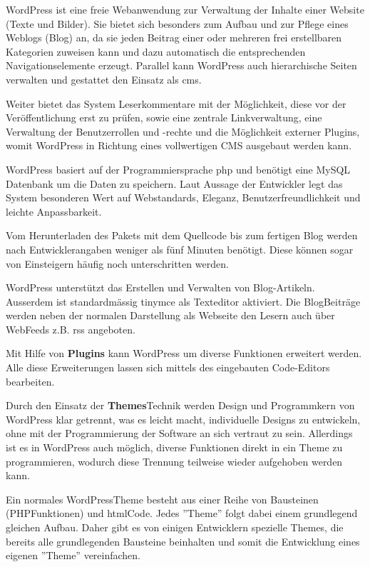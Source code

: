 \documentclass[a4paper,11pt,twoside,titlepage,openright]{report}
\numberwithin{equation}{section}		%
\numberwithin{figure}{section}			%
\numberwithin{table}{section}				%
\begin{document}
WordPress ist eine freie Webanwendung zur Verwaltung der Inhalte einer Website (Texte und Bilder). Sie bietet sich besonders zum Aufbau und zur Pflege eines Weblogs (Blog) an, da sie jeden Beitrag einer oder mehreren frei erstellbaren Kategorien zuweisen kann und dazu automatisch die entsprechenden Navigationselemente erzeugt. Parallel kann WordPress auch hierarchische Seiten verwalten und gestattet den Einsatz als \gls{cms}.

Weiter bietet das System Leserkommentare mit der Möglichkeit, diese vor der Veröffentlichung erst zu prüfen, sowie eine zentrale Linkverwaltung, eine Verwaltung der Benutzerrollen und -rechte und die Möglichkeit externer Plugins, womit WordPress in Richtung eines vollwertigen CMS ausgebaut werden kann.

WordPress basiert auf der Programmiersprache \acrshort{php} und benötigt eine MySQL Datenbank um die Daten zu speichern. Laut Aussage der Entwickler legt das System besonderen Wert auf Webstandards, Eleganz, Benutzerfreundlichkeit und leichte Anpassbarkeit.

Vom Herunterladen des Pakets mit dem Quellcode bis zum fertigen Blog werden nach Entwicklerangaben weniger als fünf Minuten benötigt. Diese können sogar von Einsteigern häufig noch unterschritten werden.

WordPress unterstützt das Erstellen und Verwalten von Blog-Artikeln. Ausserdem ist standardmässig \acrshort{tinymce} als Texteditor aktiviert. Die Blog\textendash Beiträge werden neben der normalen Darstellung als Webseite den Lesern auch über Web\textendash Feeds z.B. \acrshort{rss} angeboten.

Mit Hilfe von \textbf{Plugins} kann WordPress um diverse Funktionen erweitert werden. Alle diese Erweiterungen lassen sich mittels des eingebauten Code-Editors bearbeiten.

Durch den Einsatz der \textbf{Themes}\textendash Technik werden Design und Programmkern von WordPress klar getrennt, was es leicht macht, individuelle Designs zu entwickeln, ohne mit der Programmierung der Software an sich vertraut zu sein. Allerdings ist es in WordPress auch möglich, diverse Funktionen direkt in ein Theme zu programmieren, wodurch diese Trennung teilweise wieder aufgehoben werden kann.

Ein normales WordPress\textendash Theme besteht aus einer Reihe von Bausteinen (PHP\textendash Funktionen) und \acrshort{html}\textendash Code. Jedes ''Theme'' folgt dabei einem grundlegend gleichen Aufbau. Daher gibt es von einigen Entwicklern spezielle Themes, die bereits alle grundlegenden Bausteine beinhalten und somit die Entwicklung eines eigenen ''Theme'' vereinfachen.
\newpage
\end{document}
